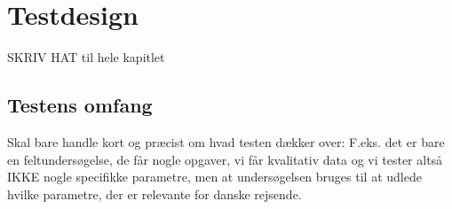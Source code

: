 \chapter{Testdesign}
\label{ParametreTestdesign}
%
SKRIV HAT til hele kapitlet 
%
\section{Testens omfang}
\label{ParametreTestensOmfangValgAfGestikker}
%




Skal bare handle kort og præcist om hvad testen dækker over: F.eks. det er bare en feltundersøgelse, de får nogle opgaver, vi får kvalitativ data og vi tester altså IKKE nogle specifikke parametre, men at undersøgelsen bruges til at udlede hvilke parametre, der er relevante for danske rejsende. 